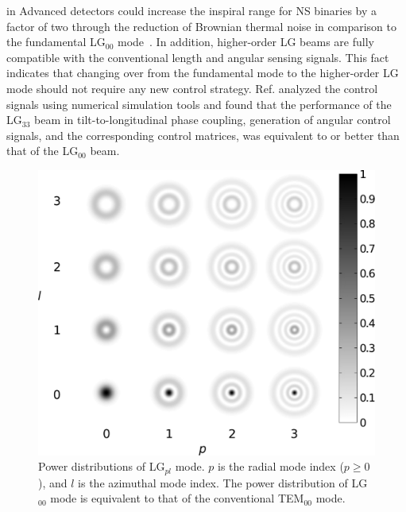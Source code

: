 in Advanced detectors could increase the inspiral range for NS binaries 
by a factor of two through the reduction of Brownian thermal noise
in comparison to the fundamental LG$_{00}$ mode~\cite{Chelkowski2009}.
%
%
In addition, higher-order LG beams are fully compatible with the conventional
length and angular sensing signals.
This fact indicates that changing over from the fundamental mode to
the higher-order LG mode should not require any new control strategy.
Ref. \cite{Chelkowski2009} analyzed the control signals using numerical simulation tools
and found that the performance of the LG$_{33}$ beam
in tilt-to-longitudinal phase coupling,
generation of angular control signals, and the corresponding control matrices,
was equivalent to or better than that of the LG$_{00}$ beam.
\begin{figure}
\centering
\includegraphics[scale =0.4]{./Sec_Optics/LGintensities33.pdf}
\caption{Power distributions of LG$_{pl}$ mode.
$p$ is the radial mode index ($p\geq0$),
and $l$ is the azimuthal mode index.
The power distribution of LG$_{00}$ mode is equivalent
to that of the conventional TEM$_{00}$ mode.%
} \label{fig:tech-LG}
\end{figure}


